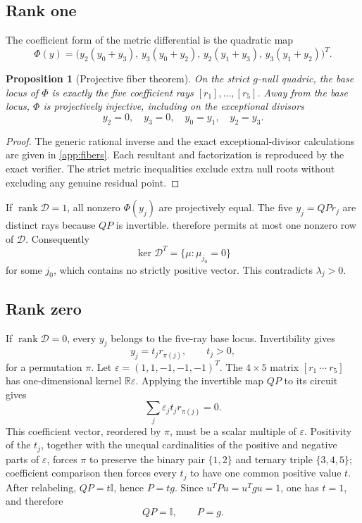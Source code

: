 \documentclass[11pt]{article}
\newtheorem{proposition}[theorem]{Proposition}
\theoremstyle{definition}
\newcommand{\rank}{\operatorname{rank}}
\newcommand{\id}{\mathbb I}
\newcommand{\R}{\mathbb R}
\newcommand{\cD}{\mathcal D}
\begin{document}
\subsection{Rank one}

The coefficient form of the metric differential is the quadratic map
\[
\Phi(y)=
\bigl(y_2(y_0+y_3),\,y_3(y_0+y_2),\,
y_2(y_1+y_3),\,y_3(y_1+y_2)\bigr)^T.
\]

\begin{proposition}[Projective fiber theorem]
\label{prop:fiber}
On the strict \(g\)-null quadric, the base locus of \(\Phi\) is exactly the
five coefficient rays \([r_1],\ldots,[r_5]\). Away from the base locus,
\(\Phi\) is projectively injective, including on the exceptional divisors
\[
y_2=0,\quad y_3=0,\quad y_0=y_1,\quad y_2=y_3.
\]
\end{proposition}

\begin{proof}
The generic rational inverse and the exact exceptional-divisor calculations
are given in \cref{app:fibers}. Each resultant and factorization is reproduced
by the exact verifier. The strict metric inequalities exclude extra null
roots without excluding any genuine residual point.
\end{proof}

If \(\rank\cD=1\), all nonzero \(\Phi(y_j)\) are projectively equal.
The five \(y_j=QPr_j\) are distinct rays because \(QP\) is invertible.
 therefore permits at most one nonzero row of \(\cD\).
Consequently
\[
\ker\cD^T=\{\mu:\mu_{j_0}=0\}
\]
for some \(j_0\), which contains no strictly positive vector. This
contradicts \(\lambda_j>0\).

\subsection{Rank zero}

If \(\rank\cD=0\), every \(y_j\) belongs to the five-ray base locus.
Invertibility gives
\[
y_j=t_jr_{\pi(j)},\qquad t_j>0,
\]
for a permutation \(\pi\). Let
\(\varepsilon=(1,1,-1,-1,-1)^T\). The \(4\times5\) matrix
\([r_1\ \cdots\ r_5]\) has one-dimensional kernel
\(\R\varepsilon\). Applying the invertible map \(QP\) to its circuit gives
\[
\sum_j\varepsilon_jt_jr_{\pi(j)}=0.
\]
This coefficient vector, reordered by \(\pi\), must be a scalar multiple of
\(\varepsilon\). Positivity of the \(t_j\), together with the unequal
cardinalities of the positive and negative parts of \(\varepsilon\), forces
\(\pi\) to preserve the binary pair \(\{1,2\}\) and ternary triple
\(\{3,4,5\}\); coefficient comparison then forces every \(t_j\) to have one
common positive value \(t\). After relabeling, \(QP=t\id\), hence \(P=tg\).
Since \(u^TPu=u^Tgu=1\), one has \(t=1\), and therefore
\[
QP=\id,\qquad P=g.
\]
\end{document}

